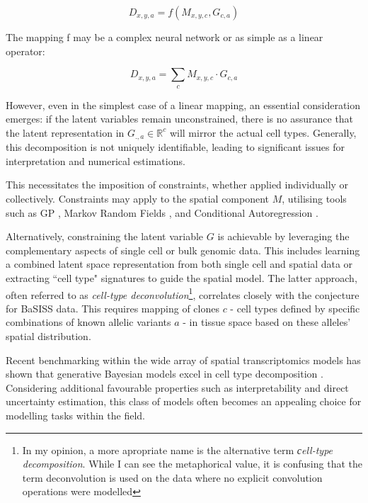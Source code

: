 \begin{equation}
    D_{x,y,a} = f(M_{x,y,c}, G_{c,a})
\end{equation}

The mapping f may be a complex neural network \parencite{Dong2022-ty, Ma2022-pd} or as simple as a linear operator:

\begin{equation}
    D_{x,y,a} = \sum_{c} M_{x,y,c} \cdot G_{c,a}
\end{equation}

However, even in the simplest case of a linear mapping, an essential consideration emerges: if the latent variables remain unconstrained, there is no assurance that the latent representation in $G_{.,a} \in \mathbb{R} ^c$ will mirror the actual cell types. Generally, this decomposition is not uniquely identifiable, leading to significant issues for interpretation and numerical estimations.

This necessitates the imposition of constraints, whether applied individually or collectively. Constraints may apply to the spatial component $M$, utilising tools such as \acf{GP} \parencite{Townes2023-uj}, Markov Random Fields \parencite{Petukhov2022-pv}, and Conditional Autoregression \parencite{Ma2022-pd, Ni2022-tu}.

Alternatively, constraining the latent variable $G$ is achievable by leveraging the complementary aspects of single cell or bulk genomic data. This includes learning a combined latent space representation from both single cell and spatial data or extracting ``cell type" signatures to guide the spatial model. The latter approach, often referred to as \emph{cell-type deconvolution}\footnote{In my opinion, a more apropriate name is the alternative term \emph{сell-type decomposition}. While I can see the metaphorical value, it is confusing that the term deconvolution is used on the data where no explicit convolution operations were modelled}, correlates closely with the conjecture for \ac{BaSISS} data. This requires mapping of clones $c$ - cell types defined by specific combinations of known allelic variants $a$ - in tissue space based on these alleles' spatial distribution.

Recent benchmarking within the wide array of spatial transcriptomics models has shown that generative Bayesian models excel in cell type decomposition \parencite{Li2023-ik}. Considering additional favourable properties such as interpretability and direct uncertainty estimation, this class of models often becomes an appealing choice for modelling tasks within the field.

